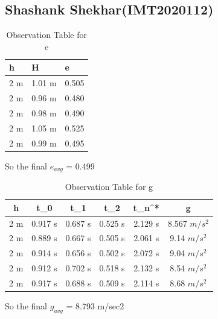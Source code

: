 \documentclass[11pt]{scrartcl} %
\begin{document}
\subsection{Shashank Shekhar(IMT2020112)}

\begin{table}[h] %
	\centering %
	\begin{tabular}{l l l}
		\toprule
		\textbf{h} & \textbf{H} & \textbf{e} \\
		\midrule
		2 m & 1.01 m & 0.505\\
        2 m & 0.96 m  & 0.480\\
        2 m & 0.98 m  & 0.490\\
        2 m & 1.05 m & 0.525 \\
        2 m & 0.99 m & 0.495 \\
		\bottomrule
	\end{tabular}
	\caption{Observation Table for e}
\end{table}
So the final $e_{avg}$ = 0.499

\begin{table}[h]
\centering
\begin{tabular}{||c c c c c c||} 
\toprule
 \hline
 h & t_0 & t_1 & t_2 & t_n^* & g \\ [0.5ex] 
 \midrule
 \hline\hline
 2 m & 0.917 s & 0.687 s  & 0.525 s & 2.129 s & 8.567 $m/s^2$  \\ 
 \hline
 2 m & 0.889 s & 0.667 s & 0.505 s & 2.061 s & 9.14 $m/s^2$  \\
 \hline 
 2 m & 0.914 s & 0.656 s & 0.502 s & 2.072 s  & 9.04 $m/s^2$   \\
 \hline
 2 m & 0.912 s & 0.702 s & 0.518 s & 2.132 s  & 8.54 $m/s^2$   \\
 \hline
 2 m & 0.917 s & 0.688 s & 0.509 s & 2.114 s  & 8.68 $m/s^2$  \\ 
 [1ex]
 \bottomrule
 \hline
\end{tabular}
\caption{Observation Table for g}
\end{table}
So the final $g_{avg}$ = 8.793 m/sec2
\end{document}
